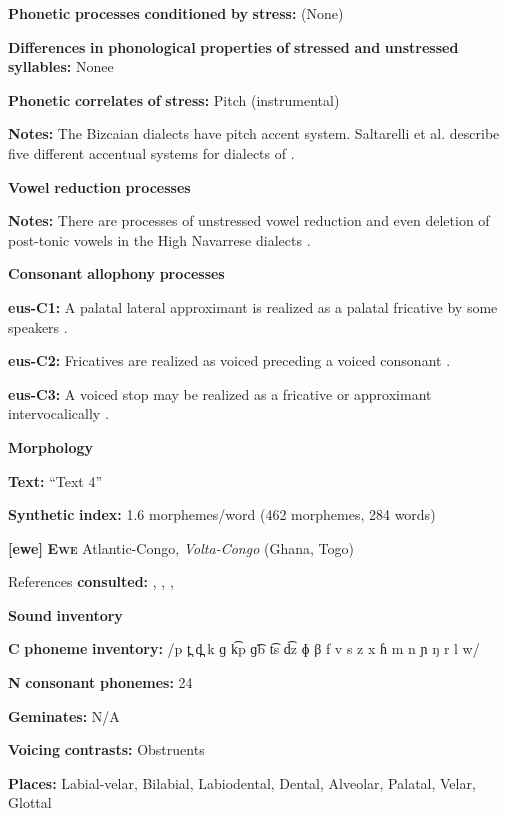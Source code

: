 \begin{styleBody}
\textbf{Phonetic} \textbf{processes} \textbf{conditioned} \textbf{by} \textbf{stress:} (None)

\textbf{Differences} \textbf{in} \textbf{phonological} \textbf{properties} \textbf{of} \textbf{stressed} \textbf{and} \textbf{unstressed} \textbf{syllables:} Nonee

\textbf{Phonetic} \textbf{correlates} \textbf{of} \textbf{stress:} Pitch (instrumental)

\textbf{Notes:} The Bizcaian dialects have pitch accent system. Saltarelli et al. describe five different accentual systems for dialects of \citet[282-3]{Basque1988}.

\textbf{Vowel} \textbf{reduction} \textbf{processes}

\textbf{Notes:} There are processes of unstressed vowel reduction and even deletion of post-tonic vowels in the High Navarrese dialects \citep[56-7]{Hualde2003}.

\textbf{Consonant} \textbf{allophony} \textbf{processes}

\textbf{eus-C1:} A palatal lateral approximant is realized as a palatal fricative by some speakers \citep[29]{Hualde2003}.

\textbf{eus-C2:} Fricatives are realized as voiced preceding a voiced consonant \citep[24]{Hualde2003}.

\textbf{eus-C3:} A voiced stop may be realized as a fricative or approximant intervocalically \citep[19]{Hualde2003}.

\textbf{Morphology}

\textbf{Text:} “Text 4” \citep[906-912]{Hualde2003}

\textbf{Synthetic} \textbf{index:} 1.6 morphemes/word (462 morphemes, 284 words)

\textbf{[ewe]}   \textbf{\textsc{Ewe}}  Atlantic-Congo, \textit{Volta-Congo} (Ghana, Togo)

References \textbf{consulted:} \citet{Ameka1991}, \citet{Duthie1996}, \citet{Jalloh2005}, \citet{Stahlke1971}

\textbf{Sound} \textbf{inventory}

\textbf{C} \textbf{phoneme} \textbf{inventory:} /p t̪ d̪ k ɡ k͡p ɡ͡b t͡s d͡z ɸ β f v s z x ɦ m n ɲ ŋ r l w/

\textbf{N} \textbf{consonant} \textbf{phonemes:} 24

\textbf{Geminates:} N/A

\textbf{Voicing} \textbf{contrasts:} Obstruents

\textbf{Places:} Labial-velar, Bilabial, Labiodental, Dental, Alveolar, Palatal, Velar, Glottal


\end{styleBody}
